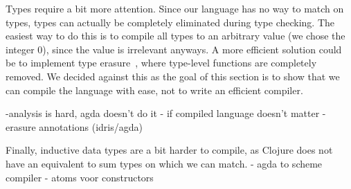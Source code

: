 Types require a bit more attention. Since our language has no way to match on types, types can actually be completely eliminated during type checking. The easiest way to do this is to compile all types to an arbitrary value (we chose the integer 0), since the value is irrelevant anyways. A more efficient solution could be to implement type erasure~\cite[Section 23.6]{tapl}, where type-level functions are completely removed. We decided against this as the goal of this section is to show that we can compile the language with ease, not to write an efficient compiler.

-analysis is hard, agda doesn't do it
- if compiled language doesn't matter
- erasure annotations (idris/agda)



Finally, inductive data types are a bit harder to compile, as Clojure does not have an equivalent to sum types on which we can match. 
- agda to scheme compiler
- atoms voor constructors
